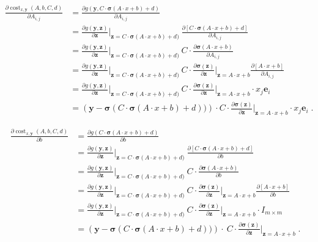 \documentclass[12pt]{article}
\DeclareMathOperator{\cost}{cost}
\newcommand{\bsigma}{\pmb{\sigma}}
\newcommand{\y}{\mathbf{y}}
\newcommand{\z}{\mathbf{z}}
\newcommand{\e}{\mathbf{e}}
\begin{document}
\begin{align*}
\frac{\partial \cost_{x,\y}(A,b,C,d)}{\partial A_{i,j}}
& = \frac{\partial g(\y, C \cdot \bsigma(A \cdot x + b) + d)}{\partial A_{i,j}} \\
& = \frac{\partial g(\y, \z)}{\partial \z}\bigg|_{\z=C \cdot \bsigma(A \cdot x + b) + d)} \ \frac{\partial [C \cdot \bsigma(A \cdot x + b) + d]}{\partial A_{i,j}} \\
& = \frac{\partial g(\y, \z)}{\partial \z}\bigg|_{\z=C \cdot \bsigma(A \cdot x + b) + d)} \ C \cdot \frac{\partial \bsigma(A \cdot x + b)}{\partial A_{i,j}} \\
& = \frac{\partial g(\y, \z)}{\partial \z}\bigg|_{\z=C \cdot \bsigma(A \cdot x + b) + d)} \ C \cdot \frac{\partial \bsigma(\z)}{\partial \z} \bigg|_{\z=A \cdot x + b} \frac{\partial [A \cdot x + b]}{\partial A_{i,j}} \\
& = \frac{\partial g(\y, \z)}{\partial \z}\bigg|_{\z=C \cdot \bsigma(A \cdot x + b) + d)} \ C \cdot \frac{\partial \bsigma(\z)}{\partial \z} \bigg|_{\z=A \cdot x + b} \cdot x_j \e_i \\
& = \left(\y - \bsigma(C \cdot \bsigma(A \cdot x + b) + d)) \right) \cdot C \cdot \frac{\partial \bsigma(\z)}{\partial \z} \bigg|_{\z=A \cdot x + b} \cdot x_j \e_i \; .
\end{align*}

\begin{align*}
\frac{\partial \cost_{x,\y}(A,b,C,d)}{\partial b}
& = \frac{\partial g(C \cdot \bsigma(A \cdot x + b) + d)}{\partial b} \\
& = \frac{\partial g(\y, \z)}{\partial \z}\bigg|_{\z=C \cdot \bsigma(A \cdot x + b) + d)} \ \frac{\partial [C \cdot \bsigma(A \cdot x + b) + d]}{\partial b} \\
& = \frac{\partial g(\y, \z)}{\partial \z}\bigg|_{\z=C \cdot \bsigma(A \cdot x + b) + d)} \ C \cdot \frac{\partial \bsigma(A \cdot x + b)}{\partial b} \\
& = \frac{\partial g(\y, \z)}{\partial \z}\bigg|_{\z=C \cdot \bsigma(A \cdot x + b) + d)} \ C \cdot \frac{\partial \bsigma(\z)}{\partial \z} \bigg|_{\z=A \cdot x + b} \frac{\partial [A \cdot x + b]}{\partial b} \\
& = \frac{\partial g(\y, \z)}{\partial \z}\bigg|_{\z=C \cdot \bsigma(A \cdot x + b) + d)} \ C \cdot \frac{\partial \bsigma(\z)}{\partial \z} \bigg|_{\z=A \cdot x + b} \cdot I_{m \times m} \\
& = \left(\y - \bsigma(C \cdot \bsigma(A \cdot x + b) + d)) \right) \cdot \ C \cdot \frac{\partial \bsigma(\z)}{\partial \z} \bigg|_{\z=A \cdot x + b} \; .
\end{align*}
\end{document}
